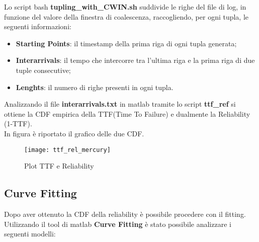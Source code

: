 Lo script bash \textbf{tupling\_with\_CWIN.sh} suddivide le righe del file di log,
in funzione del valore della finestra di coalescenza, raccogliendo, per ogni tupla,
le seguenti informazioni:

\begin{itemize}
  \item \textbf{Starting Points}: il timestamp della prima riga di ogni tupla generata;
  \item \textbf{Interarrivals}: il tempo che intercorre tra l'ultima riga e la
  prima riga di due tuple consecutive;
  \item \textbf{Lenghts}: il numero di righe presenti in ogni tupla.
\end{itemize}

Analizzando il file \textbf{interarrivals.txt} in matlab tramite lo script \textbf{ttf\_ref}
si ottiene la CDF empirica della TTF(Time To Failure) e dualmente la Reliability (1-TTF).\\
In figura è riportato il grafico delle due CDF.

\clearpage

\begin{figure}[!htbp]
  \centering
  \texttt{[image: ttf\_rel\_mercury]}
  \caption{Plot TTF e Reliability}
  \label{ttf_rel_mercury}
\end{figure}

\subsection{Curve Fitting}

Dopo aver ottenuto la CDF della reliability è possibile procedere con il fitting.\\
Utilizzando il tool di matlab \textbf{Curve Fitting} è stato possibile
analizzare i seguenti modelli:

\clearpage

